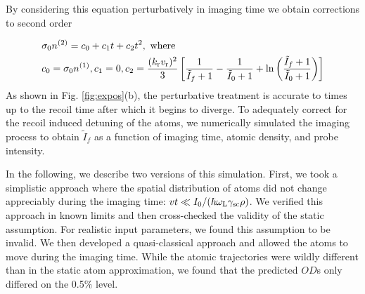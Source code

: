 \par By considering this equation perturbatively in imaging time we obtain corrections to second order \cite{LJLthesis}

\begin{eqnarray}
&\sigma_0 n^{\rm{(2)}}  =  c_0+c_1t+c_2t^2, \mbox{ where } \\
 &c_0= \sigma_0 n^{\rm{(1)}}, c_1=0, c_2=\frac{( k_{\rm{r}} v_{\rm{r}})^2}{3}\left[\frac{1}{\tilde{I}_f+1}-\frac{1}{\tilde{I}_0+1}+\mathrm{ln}\left(\frac{\tilde{I}_f+1}{\tilde{I}_0+1}\right)\right]
\label{eq:OD2}
\end{eqnarray}
As shown in  Fig. \ref{fig:expos}(b), the perturbative treatment is accurate to times up to the recoil time after which it begins to diverge. To adequately correct for the recoil induced detuning of the atoms, we numerically simulated the imaging process to obtain $\tilde{I}_f$ as a function of imaging time, atomic density, and probe intensity.
\par In the following, we describe two versions of this simulation. First, we took a simplistic approach where the spatial distribution of atoms did not change appreciably during the imaging time: $vt\ll I_0/(\hbar \omega_{\rm{L}} \gamma_{\rm{sc}} \rho)$. We verified this approach in known limits and then cross-checked the validity of the static assumption. For realistic input parameters, we found this assumption to be invalid. We then developed a quasi-classical approach and allowed the atoms to move during the imaging time. While the atomic trajectories were wildly different than in the static atom approximation, we found that the predicted $OD$s only differed on the 0.5$\%$ level.



